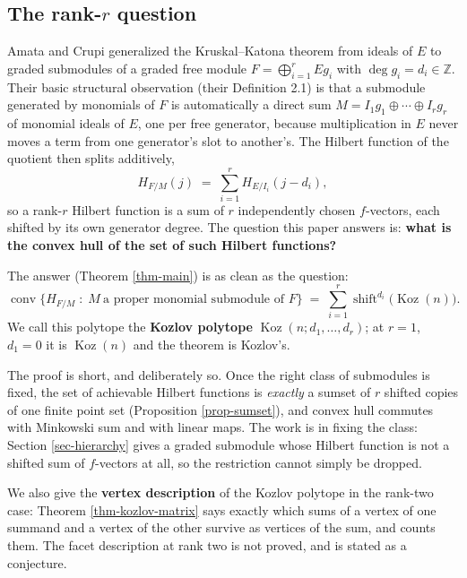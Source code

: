 \documentclass[11pt, a4paper, abstract=yes]{scrartcl}
\theoremstyle{definition}
\theoremstyle{remark}
\theoremstyle{plain}
\newcommand{\Koz}{\operatorname{Koz}}
\newcommand{\shift}{\operatorname{shift}}
\newcommand{\conv}{\operatorname{conv}}
\let\autocite\cite
\begin{document}
\subsection{The rank-\(r\) question}
\label{sec:org94ebf2b}

Amata and Crupi \autocite{AmataCrupi2020KK,AmataCrupi2020} generalized the Kruskal--Katona theorem from ideals of \(E\) to graded
submodules of a graded free module \(F=\bigoplus_{i=1}^rEg_i\) with \(\deg g_i=d_i\in\mathbb Z\).
Their basic structural observation (their Definition 2.1) is that a submodule generated by monomials
of \(F\) is automatically a direct sum \(M=I_1g_1\oplus\cdots\oplus I_rg_r\) of monomial ideals of
\(E\), one per free generator, because multiplication in \(E\) never moves a term from one
generator's slot to another's. The Hilbert function of the quotient then splits additively,
\begin{equation}\label{eq:eq-3}
  H_{F/M}(j)\;=\;\sum_{i=1}^{r}H_{E/I_i}(j-d_i),
\end{equation}
so a rank-\(r\) Hilbert function is a sum of \(r\) independently chosen \(f\)-vectors, each shifted
by its own generator degree. The question this paper answers is: \textbf{what is the convex hull of the set
of such Hilbert functions?}

The answer (Theorem \ref{thm-main}) is as clean as the question:
\begin{equation}\label{eq:eq-4}
  \conv\bigl\lbrace H_{F/M}\;:\;M\ \text{a proper monomial submodule of }F\bigr\rbrace
  \;=\;\sum_{i=1}^{r}\shift^{d_i}\bigl(\Koz(n)\bigr).
\end{equation}
We call this polytope the \textbf{Kozlov polytope} \(\Koz(n;d_1,\dots,d_r)\); at \(r=1\), \(d_1=0\) it is
\(\Koz(n)\) and the theorem is Kozlov's.

The proof is short, and deliberately so. Once the right class of submodules is fixed, the set of
achievable Hilbert functions is \emph{exactly} a sumset of \(r\) shifted copies of one finite point set
(Proposition \ref{prop-sumset}), and convex hull commutes with Minkowski sum and with linear maps. The
work is in fixing the class: Section \ref{sec-hierarchy} gives a graded submodule whose Hilbert
function is not a shifted sum of \(f\)-vectors at all, so the restriction cannot simply be dropped.

We also give the \textbf{vertex description} of the Kozlov polytope in the rank-two case: Theorem
\ref{thm-kozlov-matrix} says exactly which sums of a vertex of one summand and a vertex of the other
survive as vertices of the sum, and counts them. The facet description at rank two is not proved,
and is stated as a conjecture.
\end{document}
